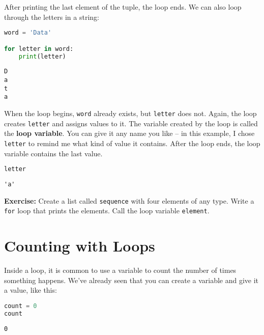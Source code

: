 After printing the last element of the tuple, the loop ends. We can also
loop through the letters in a string:

\begin{lstlisting}[language=Python,style=source]
word = 'Data'

for letter in word:
    print(letter)
\end{lstlisting}

\begin{lstlisting}[style=output]
D
a
t
a
\end{lstlisting}

When the loop begins, \passthrough{\lstinline!word!} already exists, but
\passthrough{\lstinline!letter!} does not. Again, the loop creates
\passthrough{\lstinline!letter!} and assigns values to it. The variable
created by the loop is called the \textbf{loop variable}. You can give
it any name you like -- in this example, I chose
\passthrough{\lstinline!letter!} to remind me what kind of value it
contains. After the loop ends, the loop variable contains the last
value.

\begin{lstlisting}[language=Python,style=source]
letter
\end{lstlisting}

\begin{lstlisting}[style=output]
'a'
\end{lstlisting}

\textbf{Exercise:} Create a list called
\passthrough{\lstinline!sequence!} with four elements of any type. Write
a \passthrough{\lstinline!for!} loop that prints the elements. Call the
loop variable \passthrough{\lstinline!element!}.

\section{Counting with Loops}\label{counting-with-loops}

Inside a loop, it is common to use a variable to count the number of
times something happens. We've already seen that you can create a
variable and give it a value, like this:

\begin{lstlisting}[language=Python,style=source]
count = 0
count
\end{lstlisting}

\begin{lstlisting}[style=output]
0
\end{lstlisting}

